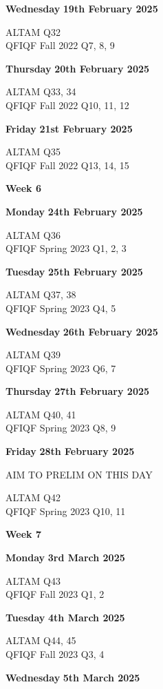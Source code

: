 \documentclass[hidelinks, 12pt]{article}
\theoremstyle{mydefstyle}
\theoremstyle{mythmstyle}
\begin{document}
\textbf{Wednesday} \hfill \textbf{19th February 2025}

ALTAM Q32 \\
QFIQF Fall 2022 Q7, 8, 9

\textbf{Thursday} \hfill \textbf{20th February 2025}

ALTAM Q33, 34 \\
QFIQF Fall 2022 Q10, 11, 12

\textbf{Friday} \hfill \textbf{21st February 2025}

ALTAM Q35 \\
QFIQF Fall 2022 Q13, 14, 15

\begin{center}
\textbf{Week 6}
\end{center}

\textbf{Monday} \hfill \textbf{24th February 2025}

ALTAM Q36 \\
QFIQF Spring 2023 Q1, 2, 3

\textbf{Tuesday} \hfill \textbf{25th February 2025}

ALTAM Q37, 38 \\
QFIQF Spring 2023 Q4, 5

\textbf{Wednesday} \hfill \textbf{26th February 2025}

ALTAM Q39 \\
QFIQF Spring 2023 Q6, 7

\textbf{Thursday} \hfill \textbf{27th February 2025}

ALTAM Q40, 41 \\
QFIQF Spring 2023 Q8, 9

\textbf{Friday} \hfill \textbf{28th February 2025}

AIM TO PRELIM ON THIS DAY

ALTAM Q42 \\
QFIQF Spring 2023 Q10, 11

\begin{center}
\textbf{Week 7}
\end{center}

\textbf{Monday} \hfill \textbf{3rd March 2025}

ALTAM Q43 \\
QFIQF Fall 2023 Q1, 2

\textbf{Tuesday} \hfill \textbf{4th March 2025}

ALTAM Q44, 45 \\
QFIQF Fall 2023 Q3, 4

\textbf{Wednesday} \hfill \textbf{5th March 2025}
\end{document}
